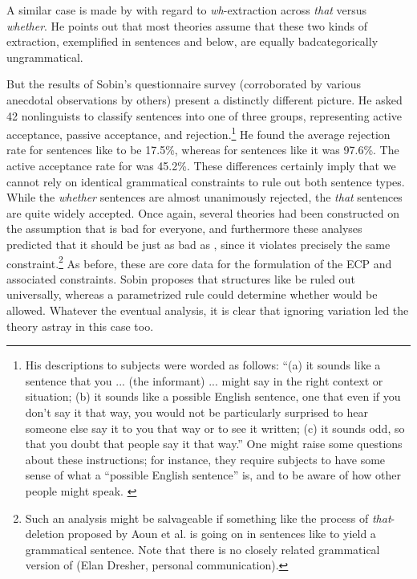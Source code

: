 A similar case is made by \citet{Sobin1987} with regard to \textit{wh}-extraction across \textit{that} versus \textit{whether}. He points out that most theories assume that these two kinds of extraction, exemplified in sentences  and  below, are equally bad\schdash{}categorically  ungrammatical.

\label{ex:2:6}\z

\label{ex:2:7}\z

\noindent
But the results of Sobin's questionnaire survey (corroborated by various anecdotal observations by others) present a distinctly different picture. He asked 42 nonlinguists to classify sentences into one of three groups, representing active acceptance, passive acceptance, and rejection.\footnote{His descriptions to subjects were worded as follows: ``(a) it sounds like a sentence that you
... (the informant) ... might say in the right context or situation; (b) it sounds like a possible English sentence, one that even if you don't say it that way, you would not be particularly surprised to hear someone else say it to you that way or to see it written; (c) it sounds odd, so that you doubt that people say it that way.'' One might raise some questions about these instructions; for instance, they require subjects to have some sense of what a ``possible English sentence'' is, and to be aware of how other people might speak. \label{fn:2:17}
}
 He found the average rejection rate for sentences like  to be 17.5\%, whereas for sentences like  it was 97.6\%. The active acceptance rate for  was 45.2\%. These differences certainly imply that we cannot rely on identical grammatical constraints to rule out both sentence types. While the \textit{whether} sentences are almost unanimously rejected, the \textit{that} sentences are quite widely accepted. Once again, several theories had been constructed on the assumption that  is bad for everyone, and furthermore these analyses predicted that it should be just as bad as , since it violates precisely the same constraint.\footnote{Such an analysis might be salvageable if something like the process of \textit{that}-deletion proposed by Aoun et al. is going on in sentences like  to yield a grammatical sentence. Note that there is no closely related grammatical version of  (Elan Dresher, personal communication).}
 As before, these are core data for the formulation of the ECP and associated constraints. Sobin proposes that structures like  be ruled out universally, whereas a parametrized rule could determine whether  would be allowed. Whatever the eventual analysis, it is clear that ignoring variation led the theory astray in this case too.

